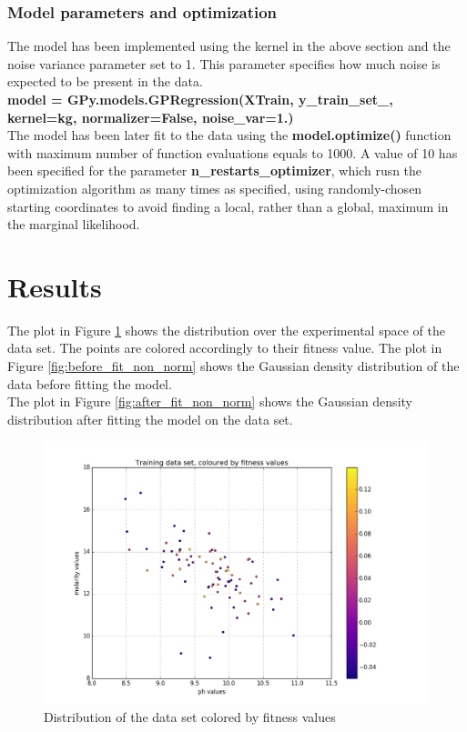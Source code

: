 \documentclass[a4paper]{article}
\begin{document}
\subsubsection{Model parameters and optimization}
The model has been implemented using the kernel in the above section and the noise variance parameter set to 1. This parameter specifies how much noise is expected to be present in the data.
\\\textbf{model = GPy.models.GPRegression(XTrain, y\_train\_set\_, kernel=kg, normalizer=False, noise\_var=1.)}
\\The model has been later fit to the data using the 
\textbf{model.optimize()} function with maximum number of function evaluations equals to 1000. 
A value of 10 has been specified for the parameter \textbf{n\_restarts\_optimizer}, which rusn the optimization algorithm as many times as specified, using randomly-chosen starting coordinates to avoid finding a local, rather than a global, maximum in the marginal likelihood.

\section{Results}
The plot in Figure \ref{fig:distributuion_data_set} shows the distribution over the experimental space of the data set. The points are colored accordingly to their fitness value.
The plot in Figure \ref{fig:before_fit_non_norm} shows the Gaussian density distribution of the data before fitting the model. 
\\The plot in Figure \ref{fig:after_fit_non_norm} shows the Gaussian density distribution after fitting the model on the data set. 

\begin{figure}
	\centering
	\includegraphics[width=1\textwidth]{train_data_set_scatter.png}
	\caption{Distribution of the data set colored by fitness values}
	\label{fig:distributuion_data_set}
\end{figure}
\end{document}
